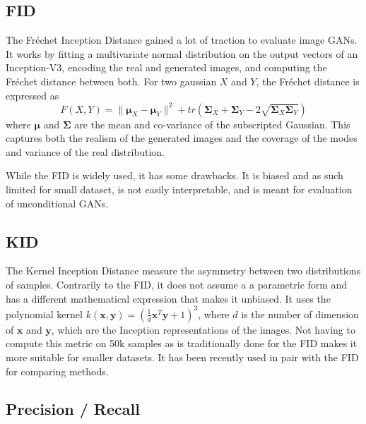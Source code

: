 \subsection{FID}

The Fréchet Inception Distance gained a lot of traction to evaluate image GANs. It works by fitting a multivariate normal distribution on the output vectors of an Inception-V3, encoding the real and generated images, and computing the Fréchet distance \citep{frechet} between both. For two gaussian $X$ and $Y$, the Fréchet distance is expressed as
\begin{equation*}
    F(X,Y) = \|\mathbf{\mu}_X - \mathbf{\mu}_Y\|^2 + tr\left(\mathbf{\Sigma}_X + \mathbf{\Sigma}_Y - 2\sqrt{\mathbf{\Sigma}_X\mathbf{\Sigma}_Y}\right)
\end{equation*}
where $\mathbf{\mu}$ and $\mathbf{\Sigma}$ are the mean and co-variance of the subscripted Gaussian.
This captures both the realism of the generated images and the coverage of the modes and variance of the real distribution.

While the FID is widely used, it has some drawbacks. It is biased and as such limited for small dataset, is not easily interpretable, and is meant for evaluation of unconditional GANs.

\subsection{\acs{KID}}
The Kernel Inception Distance measure the asymmetry between two distributions of samples. Contrarily to the \ac{FID}, it does not assume a a parametric form and has a different mathematical expression that makes it unbiased. It uses the polynomial kernel $k(\mathbf{x},\mathbf{y}) = \left(\frac{1}{d}\mathbf{x}^T\mathbf{y} + 1\right)^3$, where $d$ is the number of dimension of $\mathbf{x}$ and $\mathbf{y}$, which are the Inception representations of the images. Not having to compute this metric on 50k samples as is traditionally done for the \ac{FID} makes it more suitable for smaller datasets. It has been recently used in pair with the \ac{FID} for comparing methods.

\subsection{Precision / Recall}
\label{sec:gan-pr}

